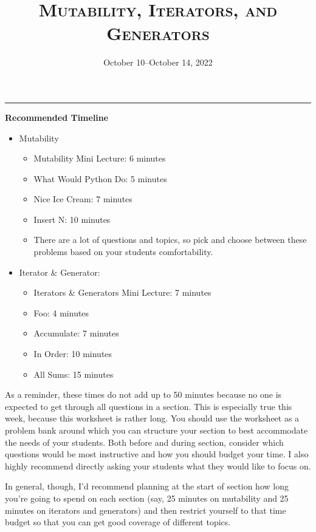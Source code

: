 \documentclass{exam}
\title{\textsc{Mutability, Iterators, and Generators}}
\date{October 10--October 14, 2022}
\begin{document}
\maketitle
\rule{\textwidth}{0.15em}
\fontsize{12}{15}\selectfont


\begin{guide}
    \textbf{Recommended Timeline}
    \begin{itemize}
        \item Mutability
        \begin{itemize}
            \item Mutability Mini Lecture: 6 minutes
            \item What Would Python Do: 5 minutes
            \item Nice Ice Cream: 7 minutes
            \item Insert N: 10 minutes
            \item There are a lot of questions and topics, so pick and choose between these problems based on your students comfortability.
        \end{itemize}
        \item Iterator \& Generator:
        \begin{itemize}
            \item Iterators \& Generators Mini Lecture: 7 minutes
            \item Foo: 4 minutes
            \item Accumulate: 7 minutes
            \item In Order: 10 minutes
            \item All Sums: 15 minutes
        \end{itemize}
    \end{itemize}

    As a reminder, these times do not add up to 50 minutes because no one is expected 
    to get through all questions in a section. This is especially true this week, 
    because this worksheet is rather long. You should use the worksheet as a problem bank
     around which you can structure your section to best accommodate the needs of your 
     students. Both before and during section, consider which questions would be most 
     instructive and how you should budget your time. I also highly recommend directly asking your students what they would like to focus on.
     
    In general, though, I'd recommend planning at the start of section how long you're going to 
    spend on each section (say, 25 minutes on mutability and 25 minutes on iterators and generators)
    and then restrict yourself to that time budget so that you can get good coverage of different topics. 
\end{guide}
\end{document}
